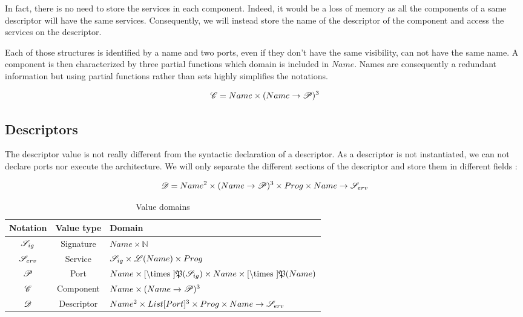 In fact, there is no need to store the services in each component. Indeed, it would be a loss of memory as all the components of a same descriptor will have the same services. Consequently, we will instead store the name of the descriptor of the component and access the services on the descriptor.

Each of those structures is identified by a name and two ports, even if they don't have the same visibility, can not have the same name. A component is then characterized by three partial functions which domain is included in $Name$. Names are consequently a redundant information but using partial functions rather than sets highly simplifies  the notations.

\[\mathcal{C}= Name \times (Name \rightarrow \mathcal{P})^3\]



\subsection{Descriptors}
The descriptor value is not really different from the syntactic declaration of a descriptor. As a descriptor is not instantiated, we can not declare ports nor execute the architecture. We will only separate the different sections of the descriptor and store them in different fields : 

\[\mathcal{D} = Name^2 \times (Name \rightarrow \mathcal{P})^3 \times Prog \times Name\rightarrow \mathcal{S}_{erv}\]


\begin{table}[!ht]
\begin{center}
\begin{tabular}{|c|c|l|}

\hline
Notation & Value type & Domain\\
\hline
 $\mathcal{S}_{ig}$  &  Signature & $Name \times \mathbb{N}$\\
 $\mathcal{S}_{erv}$ & Service & $\mathcal{S}_{ig} \times \mathcal{L}(Name) \times Prog$ \\
 $\mathcal{P}$ & Port & $Name \times \Cref \times \mathfrak{P}(\Sig)\times Name \times \Cref \times \mathfrak{P}(Name)$ \\
 $\mathcal{C}$ & Component & $ Name \times (Name \rightarrow \mathcal{P})^3$ \\
 $\mathcal{D}$ &  Descriptor & $ Name^2 \times List[Port]^3 \times Prog \times Name\rightarrow \mathcal{S}_{erv} $\\

\hline
\end{tabular}
\end{center}
\label{tab:DomVal}
\caption{Value domains}
\end{table}

